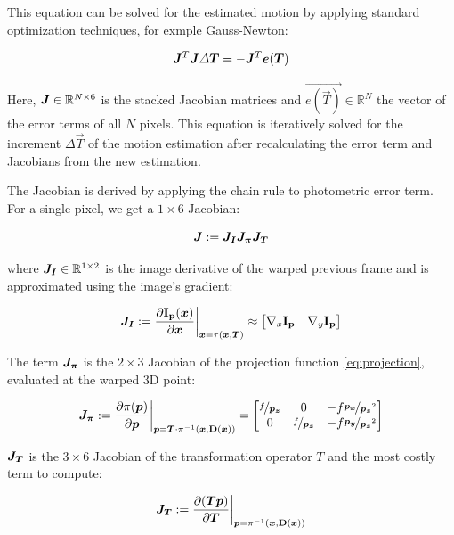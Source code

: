 This equation can be solved for the estimated motion by applying standard
optimization techniques, for exmple Gauss-Newton:

\begin{equation}
    \mat{J}^T \mat{J} \Delta \vec{T} = - \mat{J}^T \vec{e(\vec{T})}
\end{equation}

Here, $\mat{J} \in \mathbb{R}^{N \times 6}$ is the stacked Jacobian matrices
and $\vec{e(\vec{T})} \in \mathbb{R}^N$ the vector of the error terms of all
$N$ pixels.  This equation is iteratively solved for the increment $\Delta
\vec{T}$ of the motion estimation after recalculating the error term and
Jacobians from the new estimation.

The Jacobian is derived by applying the chain rule to photometric error term.
For a single pixel, we get a $1 \times 6$ Jacobian:

\begin{equation}
    \mat{J} := \mat{J_I} \mat{J_{\pi}} \mat{J_T}
\end{equation}

where $\mat{J_I} \in \mathbb{R}^{1 \times 2}$ is the image derivative of the warped previous frame and is
approximated using the image's gradient:

\begin{equation}
    \mat{J_I} := \frac{\partial \mathbf{I_p}(\vec{x})} {\partial \vec{x}} \bigg|_{\vec{x} = \tau(\vec{x}, \vec{T})}
    \approx
    \begin{bmatrix}
        \nabla{}_x \mathbf{I_p} & \nabla{}_y \mathbf{I_p}
    \end{bmatrix}
\end{equation}

The term $\mat{J_{\pi}}$ is the $2 \times 3$ Jacobian of the projection
function \ref{eq:projection}, evaluated at the warped 3D point:

\begin{equation}
    \mat{J_{\pi}} := \frac{\partial \pi(\vec{p})}{\partial \vec{p}}
    \bigg|_{\vec{p} = \vec{T}\cdot\pi^{-1}(\vec{x},\mathbf{D}(\vec{x}))}
    =
    \begin{bmatrix}
        \nicefrac{f}{\vec{p_z}} & 0 & -f \nicefrac{\vec{p_x}}{\vec{p_z}^2} \\
        0 & \nicefrac{f}{\vec{p_z}} & -f \nicefrac{\vec{p_y}}{\vec{p_z}^2}
    \end{bmatrix}
\end{equation}

$\mat{J_T}$ is the $3 \times 6$ Jacobian of the transformation operator $T$ and
the most costly term to compute:

\begin{equation}
    \mat{J_T} := \frac{\partial (\vec{T} \vec{p})}{\partial \vec{T}}
    \bigg|_{\vec{p} = \pi^{-1}(\vec{x}, \mathbf{D}(\vec{x}))}
\end{equation}
